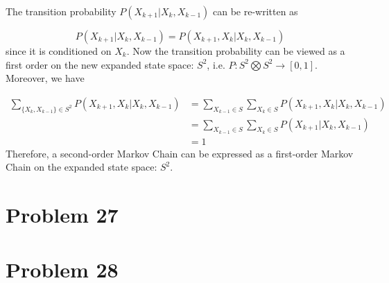 \documentclass[a4paper, 11pt]{article}
\begin{document}
The transition probability $P(X_{k+1}|X_k, X_{k-1})$ can be re-written as

\begin{equation}
P(X_{k+1}|X_k, X_{k-1}) = P(X_{k+1}, X_k|X_k, X_{k-1})
\end{equation}
since it is conditioned on $X_k$. Now the transition probability can be viewed as a first order on the new expanded state space: $S^2$, i.e. $P: {S^2 \bigotimes  S^2} \to [0, 1]$. Moreover, we have 

\begin{equation}
\begin{split}
\sum_{\{X_k, X_{k-1}\}\in S^2} P(X_{k+1}, X_k|X_k, X_{k-1}) & = \sum_{X_{k-1}\in S}\sum_{X_k\in S} P(X_{k+1}, X_k|X_k, X_{k-1}) \\
 & = \sum_{X_{k-1}\in S}\sum_{X_k\in S} P(X_{k+1}|X_k, X_{k-1})\\
 & = 1
\end{split}
\end{equation}
Therefore, a second-order Markov Chain can be expressed as a first-order Markov Chain on the expanded state space: $S^2$. 


\section*{Problem 27}




\section*{Problem 28}
\end{document}
